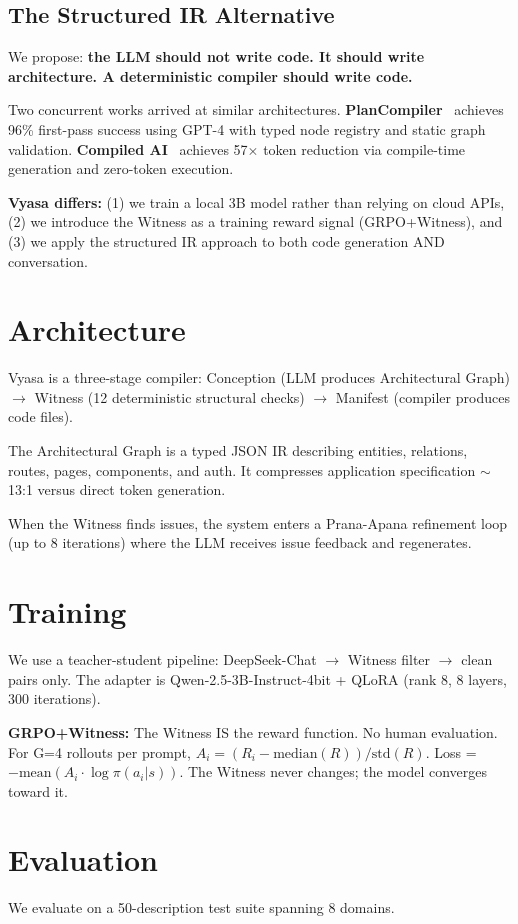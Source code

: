 \documentclass{article}
\begin{document}
\subsection{The Structured IR Alternative}
We propose: \textbf{the LLM should not write code. It should write architecture. A deterministic compiler should write code.}

Two concurrent works arrived at similar architectures. \textbf{PlanCompiler}~\cite{plancompiler} achieves 96\% first-pass success using GPT-4 with typed node registry and static graph validation. \textbf{Compiled AI}~\cite{compiledai} achieves 57$\times$ token reduction via compile-time generation and zero-token execution.

\textbf{Vyasa differs:} (1) we train a local 3B model rather than relying on cloud APIs, (2) we introduce the Witness as a training reward signal (GRPO+Witness), and (3) we apply the structured IR approach to both code generation AND conversation.

\section{Architecture}
Vyasa is a three-stage compiler: Conception (LLM produces Architectural Graph) $\rightarrow$ Witness (12 deterministic structural checks) $\rightarrow$ Manifest (compiler produces code files).

The Architectural Graph is a typed JSON IR describing entities, relations, routes, pages, components, and auth. It compresses application specification $\sim$13:1 versus direct token generation.

When the Witness finds issues, the system enters a Prana-Apana refinement loop (up to 8 iterations) where the LLM receives issue feedback and regenerates.

\section{Training}
We use a teacher-student pipeline: DeepSeek-Chat $\rightarrow$ Witness filter $\rightarrow$ clean pairs only. The adapter is Qwen-2.5-3B-Instruct-4bit + QLoRA (rank 8, 8 layers, 300 iterations).

\textbf{GRPO+Witness:} The Witness IS the reward function. No human evaluation. For G=4 rollouts per prompt, $A_i = (R_i - \text{median}(R)) / \text{std}(R)$. Loss = $-\text{mean}(A_i \cdot \log \pi(a_i|s))$. The Witness never changes; the model converges toward it.

\section{Evaluation}
We evaluate on a 50-description test suite spanning 8 domains.
\end{document}
